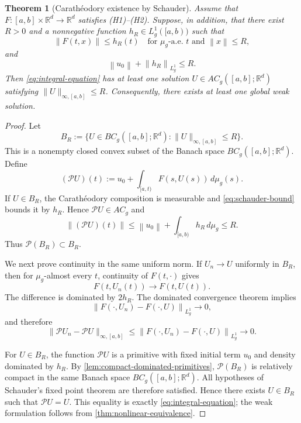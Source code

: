 \documentclass[preprint,12pt]{elsarticle}
\newtheorem{theorem}{Theorem}[section]
\theoremstyle{definition}
\theoremstyle{remark}
\newcommand{\R}{\mathbb R}
\newcommand{\norm}[1]{\left\lVert#1\right\rVert}
\begin{document}
\begin{theorem}[Carath\'eodory existence by Schauder]\label{thm:schauder-existence}
Assume that $F:[a,b]\times\R^d\to\R^d$ satisfies \textup{(H1)--(H2)}. Suppose, in addition, that there exist $R>0$ and a nonnegative function $h_R\in L_g^1([a,b))$ such that
\begin{equation}\label{eq:schauder-bound}
 \norm{F(t,x)}\le h_R(t)
 \quad\text{for }\mu_g\text{-a.e. }t
 \text{ and }\norm{x}\le R,
\end{equation}
and
\begin{equation}\label{eq:schauder-ball}
 \norm{u_0}+\norm{h_R}_{L_g^1}\le R.
\end{equation}
Then \eqref{eq:integral-equation} has at least one solution $U\in AC_g([a,b];\R^d)$ satisfying $\|U\|_{\infty,[a,b]}\le R$. Consequently, there exists at least one global weak solution.
\end{theorem}

\begin{proof}
Let
\[
 B_R:=\{U\in BC_g([a,b];\R^d):\|U\|_{\infty,[a,b]}\le R\}.
\]
This is a nonempty closed convex subset of the Banach space $BC_g([a,b];\R^d)$. Define
\[
 (\mathcal PU)(t):=u_0+\int_{[a,t)}F(s,U(s))\,d\mu_g(s).
\]
If $U\in B_R$, the Carath\'eodory composition is measurable and \eqref{eq:schauder-bound} bounds it by $h_R$. Hence $\mathcal PU\in AC_g$ and
\[
 \norm{(\mathcal PU)(t)}
 \le \norm{u_0}+\int_{[a,b)}h_R\,d\mu_g
 \le R.
\]
Thus $\mathcal P(B_R)\subset B_R$.

We next prove continuity in the same uniform norm. If $U_n\to U$ uniformly in $B_R$, then for $\mu_g$-almost every $t$, continuity of $F(t,\cdot)$ gives
\[
 F(t,U_n(t))\longrightarrow F(t,U(t)).
\]
The difference is dominated by $2h_R$. The dominated convergence theorem implies
\[
 \norm{F(\cdot,U_n)-F(\cdot,U)}_{L_g^1}\longrightarrow0,
\]
and therefore
\[
 \|\mathcal PU_n-\mathcal PU\|_{\infty,[a,b]}
 \le \norm{F(\cdot,U_n)-F(\cdot,U)}_{L_g^1}\longrightarrow0.
\]

For $U\in B_R$, the function $\mathcal PU$ is a primitive with fixed initial term $u_0$ and density dominated by $h_R$. By \cref{lem:compact-dominated-primitives}, $\mathcal P(B_R)$ is relatively compact in the same Banach space $BC_g([a,b];\R^d)$. All hypotheses of Schauder's fixed point theorem are therefore satisfied. Hence there exists $U\in B_R$ such that $\mathcal PU=U$. This equality is exactly \eqref{eq:integral-equation}; the weak formulation follows from \cref{thm:nonlinear-equivalence}.
\end{proof}
\end{document}
